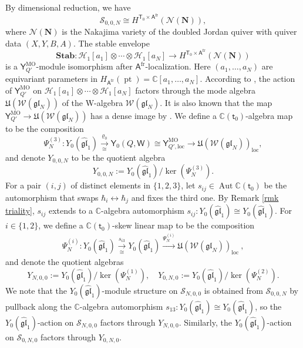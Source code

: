 \documentclass[10pt]{amsart}
\theoremstyle{definition}
\numberwithin{equation}{section}
\newcommand{\bC}{\mathbb{C}}
\newcommand{\cH}{\mathcal{H}}
\newcommand{\cN}{\mathcal{N}}
\newcommand{\cS}{\mathcal{S}}
\newcommand{\cW}{\mathcal{W}}
\newcommand{\loc}{\mathrm{loc}}
\newcommand{\sA}{\mathsf{A}}
\newcommand{\sT}{\mathsf{T}}
\newcommand{\sW}{\mathsf{W}}
\newcommand{\Aut}{\operatorname{Aut}}
\newcommand{\pt}{\operatorname{pt}}
\begin{document}
By dimensional reduction, we have 
$$\cS_{0,0,N}\cong H^{\sT_0\times \sA^{\mathrm{fr}}}(\cN(\mathbf N)), $$ 
where $\cN(\mathbf N)$ is the Nakajima variety of the doubled Jordan quiver with quiver data $(X,Y,B,A)$. The stable envelope $$\mathbf{Stab}\colon \cH_1[a_1]\otimes\cdots\otimes \cH_1[a_N]\to H^{\sT_0\times \sA^{\mathrm{fr}}}(\cN(\mathbf N))$$
is a $\mathsf Y_{Q'}^{\text{MO}}$-module isomorphism after $\sA^{\mathrm{fr}}$-localization. Here $(a_1,\ldots,a_N)$ are equivariant parameters in $H_{\sA^{\mathrm{fr}}}(\pt)=\bC[a_1,\ldots,a_N]$. According to \cite[Prop.~19.2.2]{MO}, the action of $\mathsf Y_{Q'}^{\text{MO}}$ on $\cH_1[a_1]\otimes\cdots\otimes \cH_1[a_N]$ factors through the mode algebra $\mathfrak{U}(\cW(\mathfrak{gl}_N))$ of the W-algebra $\cW(\mathfrak{gl}_N)$. It is also known that the map $\mathsf Y_{Q'}^{\text{MO}}\to \mathfrak{U}(\cW(\mathfrak{gl}_N))$ has a dense image by \cite[Prop.~19.2.3]{MO}. We define a $\bC(\mathsf t_0)$-algebra map 
to be the composition
$$\Psi^{(3)}_N\colon Y_0(\widehat{\mathfrak{gl}}_1)\xrightarrow[\cong]{\varrho_0}\mathsf Y_0(Q,\sW)\cong \mathsf Y_{Q',\loc}^{\text{MO}}\to \mathfrak{U}(\cW(\mathfrak{gl}_N))_\loc, $$
and denote $Y_{0,0,N}$ to be the quotient algebra 
$$Y_{0,0,N}:=Y_0(\widehat{\mathfrak{gl}}_1)/\ker(\Psi^{(3)}_N). $$ 
For a pair $(i,j)$ of distinct elements in $\{1,2,3\}$, let $s_{ij}\in \Aut\bC(\mathsf t_0)$ be the automorphism that swaps $\hbar_i\leftrightarrow\hbar_j$ and fixes the third one. By Remark \ref{rmk triality}, $s_{ij}$ extends to a $\bC$-algebra automorphism $s_{ij}\colon Y_0(\widehat{\mathfrak{gl}}_1)\cong Y_0(\widehat{\mathfrak{gl}}_1)$. For $i\in\{1,2\}$, we define a $\bC(\mathsf t_0)$-skew linear map 
to be the composition 
\begin{align*}
\Psi^{(i)}_N\colon Y_0(\widehat{\mathfrak{gl}}_1)\xrightarrow[\cong]{s_{i3}} Y_0(\widehat{\mathfrak{gl}}_1)\xrightarrow{\Psi^{(i)}_N} \mathfrak{U}(\cW(\mathfrak{gl}_N))_\loc\:,
\end{align*}
and denote the quotient algebras 
$$Y_{N,0,0}:=Y_0(\widehat{\mathfrak{gl}}_1)/\ker(\Psi^{(1)}_N), \quad Y_{0,N,0}:=Y_0(\widehat{\mathfrak{gl}}_1)/\ker(\Psi^{(2)}_N).$$ 
We note that the $Y_0(\widehat{\mathfrak{gl}}_1)$-module structure on $\cS_{N,0,0}$ is obtained from $\cS_{0,0,N}$ by pullback along the $\bC$-algebra automorphism $s_{13}\colon Y_0(\widehat{\mathfrak{gl}}_1)\cong Y_0(\widehat{\mathfrak{gl}}_1)$, so the $Y_0(\widehat{\mathfrak{gl}}_1)$-action on $\cS_{N,0,0}$ factors through $Y_{N,0,0}$. Similarly, the $Y_0(\widehat{\mathfrak{gl}}_1)$-action on $\cS_{0,N,0}$ factors through $Y_{0,N,0}$.
\end{document}
